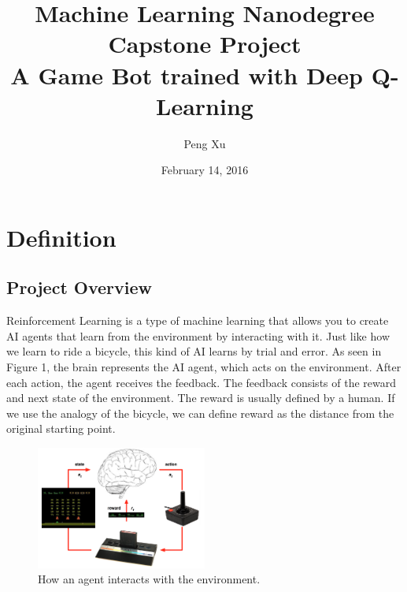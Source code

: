 \documentclass[a4paper]{article}
\begin{document}


\title{Machine Learning Nanodegree \\ Capstone Project \\ A Game Bot trained with Deep Q-Learning }
\author{Peng Xu}
\date{February 14, 2016}
\maketitle


\section{Definition}

\subsection{Project Overview}

Reinforcement Learning is a type of machine learning that allows you to create AI agents that learn from the environment by interacting with it. Just like how we learn to ride a bicycle, this kind of AI learns by trial and error. As seen in Figure 1, the brain represents the AI agent, which acts on the environment. After each action, the agent receives the feedback. The feedback consists of the reward and next state of the environment. The reward is usually defined by a human. If we use the analogy of the bicycle, we can define reward as the distance from the original starting point.

\begin{figure}[h]
\centering
\includegraphics[width=0.5\textwidth]{game-reinforcement-learning.png}
\caption{How an agent interacts with the environment.}
\end{figure}
\end{document}
